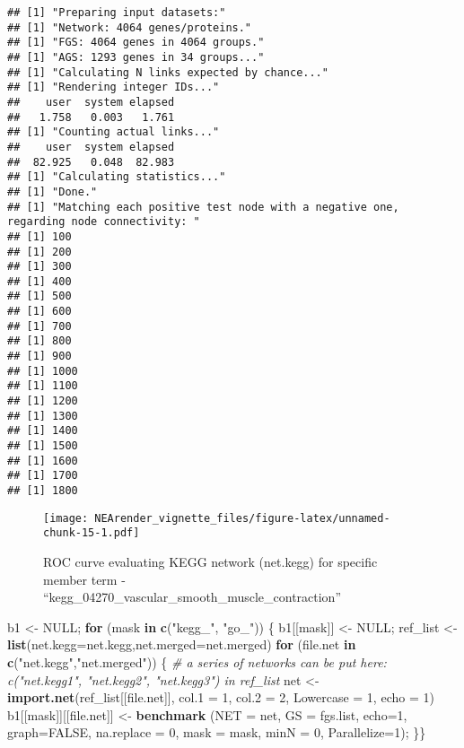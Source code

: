 \documentclass[]{article}
\newenvironment{Shaded}{\begin{snugshade}}{\end{snugshade}}
\newcommand{\KeywordTok}[1]{\textcolor[rgb]{0.13,0.29,0.53}{\textbf{#1}}}
\newcommand{\DataTypeTok}[1]{\textcolor[rgb]{0.13,0.29,0.53}{#1}}
\newcommand{\DecValTok}[1]{\textcolor[rgb]{0.00,0.00,0.81}{#1}}
\newcommand{\StringTok}[1]{\textcolor[rgb]{0.31,0.60,0.02}{#1}}
\newcommand{\CommentTok}[1]{\textcolor[rgb]{0.56,0.35,0.01}{\textit{#1}}}
\newcommand{\OtherTok}[1]{\textcolor[rgb]{0.56,0.35,0.01}{#1}}
\newcommand{\ControlFlowTok}[1]{\textcolor[rgb]{0.13,0.29,0.53}{\textbf{#1}}}
\newcommand{\NormalTok}[1]{#1}
\begin{document}
\begin{verbatim}
## [1] "Preparing input datasets:"
## [1] "Network: 4064 genes/proteins."
## [1] "FGS: 4064 genes in 4064 groups."
## [1] "AGS: 1293 genes in 34 groups..."
## [1] "Calculating N links expected by chance..."
## [1] "Rendering integer IDs..."
##    user  system elapsed 
##   1.758   0.003   1.761 
## [1] "Counting actual links..."
##    user  system elapsed 
##  82.925   0.048  82.983 
## [1] "Calculating statistics..."
## [1] "Done."
## [1] "Matching each positive test node with a negative one, regarding node connectivity: "
## [1] 100
## [1] 200
## [1] 300
## [1] 400
## [1] 500
## [1] 600
## [1] 700
## [1] 800
## [1] 900
## [1] 1000
## [1] 1100
## [1] 1200
## [1] 1300
## [1] 1400
## [1] 1500
## [1] 1600
## [1] 1700
## [1] 1800
\end{verbatim}

\begin{figure}
\centering
\texttt{[image: NEArender\_vignette\_files/figure-latex/unnamed-chunk-15-1.pdf]}
\caption{ROC curve evaluating KEGG network (net.kegg) for specific
member term - ``kegg\_04270\_vascular\_smooth\_muscle\_contraction''}
\end{figure}

\begin{Shaded}
\begin{Highlighting}[]
\NormalTok{b1 <-}\StringTok{ }\OtherTok{NULL}\NormalTok{;}
\ControlFlowTok{for}\NormalTok{ (mask }\ControlFlowTok{in} \KeywordTok{c}\NormalTok{(}\StringTok{"kegg_"}\NormalTok{, }\StringTok{"go_"}\NormalTok{)) \{}
\NormalTok{b1[[mask]] <-}\StringTok{ }\OtherTok{NULL}\NormalTok{;}
\NormalTok{ref_list <-}\StringTok{ }\KeywordTok{list}\NormalTok{(}\DataTypeTok{net.kegg=}\NormalTok{net.kegg,}\DataTypeTok{net.merged=}\NormalTok{net.merged)}
\ControlFlowTok{for}\NormalTok{ (file.net }\ControlFlowTok{in} \KeywordTok{c}\NormalTok{(}\StringTok{"net.kegg"}\NormalTok{,}\StringTok{"net.merged"}\NormalTok{)) \{}
\CommentTok{# a series of networks can be put here: c("net.kegg1", "net.kegg2", "net.kegg3") in ref_list}
\NormalTok{net <-}\StringTok{ }\KeywordTok{import.net}\NormalTok{(ref_list[[file.net]], }\DataTypeTok{col.1 =} \DecValTok{1}\NormalTok{, }\DataTypeTok{col.2 =} \DecValTok{2}\NormalTok{, }\DataTypeTok{Lowercase =} \DecValTok{1}\NormalTok{, }\DataTypeTok{echo =} \DecValTok{1}\NormalTok{)}
\NormalTok{b1[[mask]][[file.net]] <-}\StringTok{ }\KeywordTok{benchmark}\NormalTok{ (}\DataTypeTok{NET =}\NormalTok{ net, }\DataTypeTok{GS =}\NormalTok{ fgs.list, }\DataTypeTok{echo=}\DecValTok{1}\NormalTok{, }
\DataTypeTok{graph=}\OtherTok{FALSE}\NormalTok{, }\DataTypeTok{na.replace =} \DecValTok{0}\NormalTok{, }\DataTypeTok{mask =}\NormalTok{ mask, }\DataTypeTok{minN =} \DecValTok{0}\NormalTok{,  }\DataTypeTok{Parallelize=}\DecValTok{1}\NormalTok{);}
\NormalTok{\}\}}
\end{Highlighting}
\end{Shaded}
\end{document}
